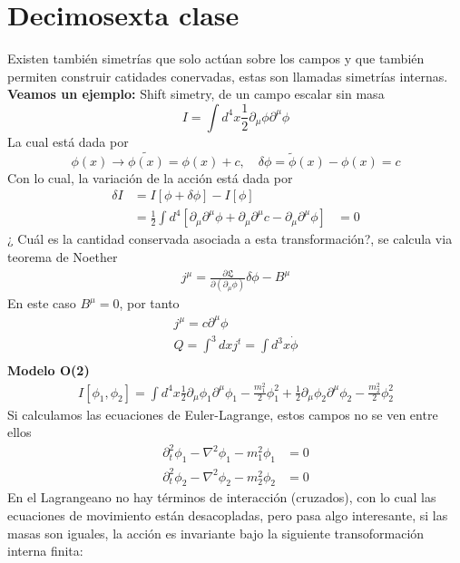 \documentclass[../main.tex]{subfiles}
\begin{document}
\section{Decimosexta clase}
Existen también simetrías que solo actúan sobre los campos y que también permiten construir catidades conervadas, estas son llamadas simetrías internas. \\
\textbf{Veamos un ejemplo:} Shift simetry, de un campo escalar sin masa
\begin{equation}
  I = \int d^4 x \frac{1}{2}\partial_\mu \phi \partial^\mu \phi 
\end{equation}
La cual está dada por
\begin{equation}
  \phi(x) \rightarrow \tilde{\phi(x)} = \phi(x)+c, \quad \delta \phi = \tilde{\phi}(x)-\phi(x) = c
\end{equation}
Con lo cual, la variación de la acción está dada por
\begin{align*}
  \delta I & = I [\phi + \delta \phi]- I [\phi] \\
  & = \frac{1}{2}\int d^4 \left[ \partial_\mu\partial^\mu \phi + \partial_\mu\partial^\mu c - \partial_\mu\partial^\mu \phi \right]
  & = 0 
\end{align*}
¿ Cuál es la cantidad conservada asociada a esta transformación?, se calcula via teorema de Noether
\begin{align*}
  j^\mu = \frac{\partial \mathfrak{L}}{\partial (\partial_\mu \phi)} \delta \phi - B^\mu 
\end{align*}
En este caso  $B^\mu = 0$, por tanto
\begin{align*}
  j^\mu = c\partial^\mu \phi \\
  Q= \int^3 dx j^t = \int d^3x \dot{\phi} \\
\end{align*}
\textbf{Modelo O(2)}
\begin{align*}
  I[\phi_1,\phi_2] = \int d^4x \frac{1}{2}\partial_\mu \phi_1 \partial^\mu \phi_1 - \frac{m_1^2}{2}\phi^2_1 +  \frac{1}{2}\partial_\mu \phi_2 \partial^\mu \phi_2 - \frac{m_2^2}{2}\phi^2_2 
\end{align*}
Si calculamos las ecuaciones de Euler-Lagrange, estos campos no se ven entre ellos
\begin{align*}
  \partial^2_t \phi_1 - \nabla^2 \phi_1 - m_1^2\phi_1 & = 0 \\
  \partial_t^2 \phi_2 - \nabla^2 \phi_2 - m_2^2 \phi_2 & = 0
\end{align*}
En el Lagrangeano no hay términos de interacción (cruzados), con lo cual las ecuaciones de movimiento están desacopladas, pero pasa algo interesante, si las masas son iguales, la acción es invariante bajo la siguiente transoformación interna finita:
\end{document}
